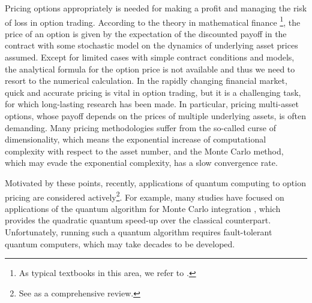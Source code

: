 Pricing options appropriately is needed for making a profit and managing the risk of loss in option trading.
According to the theory in mathematical finance \footnote{As typical textbooks in this area, we refer to \cite{hull2003options,shreve2004stochastic}.}, the price of an option is given by the expectation of the discounted payoff in the contract with some stochastic model on the dynamics of underlying asset prices assumed.
Except for limited cases with simple contract conditions and models, the analytical formula for the option price is not available and thus we need to resort to the numerical calculation.
In the rapidly changing financial market, quick and accurate pricing is vital in option trading, but it is a challenging task, for which long-lasting research has been made.
In particular, pricing multi-asset options, whose payoff depends on the prices of multiple underlying assets, is often demanding.
Many pricing methodologies suffer from the so-called curse of dimensionality, which means the exponential increase of computational complexity with respect to the asset number, and the Monte Carlo method, which may evade the exponential complexity, has a slow convergence rate.

Motivated by these points, recently, applications of quantum computing to option pricing are considered actively\footnote{See \cite{herman2023quantum} as a comprehensive review.}.
For example, many studies have focused on applications of the quantum algorithm for Monte Carlo integration \cite{montanaro2015}, which provides the quadratic quantum speed-up over the classical counterpart.
Unfortunately, running such a quantum algorithm requires fault-tolerant quantum computers, which may take decades to be developed. 

